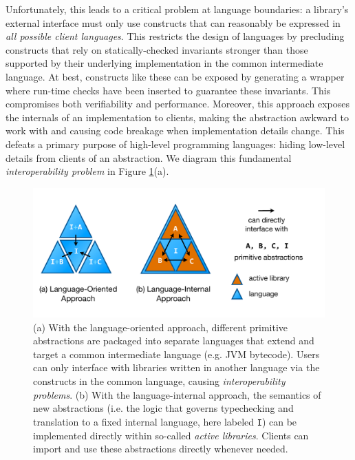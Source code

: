 \documentclass{llncs}
\begin{document}
Unfortunately, this leads to a critical problem at language boundaries: a library's external interface must only use constructs that can reasonably be expressed in \emph{all possible client languages}. This restricts the design of  languages by precluding constructs that rely on statically-checked invariants stronger than those supported by their underlying implementation in the common intermediate language. At best, constructs like these can be exposed by generating a wrapper where run-time checks have been inserted to guarantee these invariants. This compromises both verifiability and performance. %
Moreover, this approach exposes the internals of an implementation to clients, making the abstraction awkward to work with and causing code breakage when implementation details change. This defeats a primary purpose of high-level programming languages: hiding low-level details from clients of an abstraction. We diagram this fundamental \emph{interoperability problem} in Figure \ref{approaches}(a).
\begin{figure}[t]
\vspace{-15px}
\includegraphics[scale=0.415]{approaches.pdf}
\vspace{-30px}
\caption{(a) With the language-oriented approach, different primitive abstractions are packaged into separate languages that extend and target a common intermediate language (e.g. JVM bytecode). Users can only interface with libraries written in another language via the constructs in the common language, causing \emph{interoperability problems}. (b) With the language-internal approach, the semantics of new abstractions (i.e. the logic that governs typechecking and translation to a fixed {internal language}, here labeled \texttt{I}) can be implemented directly within so-called \emph{active libraries}. Clients can import and use these abstractions directly whenever needed.}
\vspace{-10px}
\label{approaches}
\end{figure}
\end{document}
